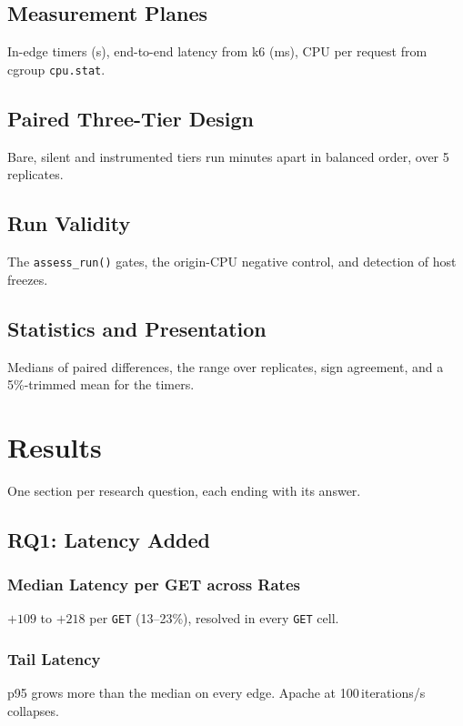 \documentclass{rptuma}
\begin{document}
\section{Measurement Planes}
In-edge timers (\textmu s), end-to-end latency from k6 (ms), CPU per request from cgroup
\texttt{cpu.stat}.

\section{Paired Three-Tier Design}
Bare, silent and instrumented tiers run minutes apart in balanced order, over 5 replicates.

\section{Run Validity}
\label{sec:AB.validity}
The \texttt{assess\_run()} gates, the origin-CPU negative control, and detection of host freezes.

\section{Statistics and Presentation}
Medians of paired differences, the range over replicates, sign agreement, and a 5\%-trimmed mean
for the timers.

\chapter{Results}
\label{chap:AB.results}
One section per research question, each ending with its answer.

\section{RQ1: Latency Added}
\subsection{Median Latency per GET across Rates}
$+109$ to $+218$\us{} per \texttt{GET} (13--23\%), resolved in every \texttt{GET} cell.
\subsection{Tail Latency}
p95 grows more than the median on every edge. Apache at 100\,iterations/s collapses.
\end{document}
